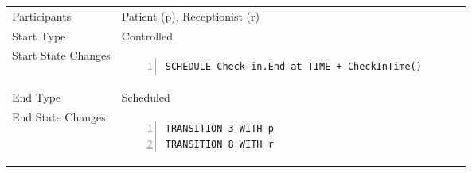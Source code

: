 \begin{tabular}{@{}>{\raggedright\arraybackslash}p{4.5cm}>{\raggedright\arraybackslash}p{12.5cm}@{}}
      \toprule
      Participants  & Patient (p), Receptionist (r) \\
      Start Type & Controlled \\
      Start State Changes &
\begin{Verbatim}[numbers=left]
SCHEDULE Check in.End at TIME + CheckInTime()
\end{Verbatim}
      \\
     End Type& Scheduled \\
     End State Changes &
\begin{Verbatim}[numbers=left]
TRANSITION 3 WITH p
TRANSITION 8 WITH r
\end{Verbatim}
      \\ \bottomrule
      \end{tabular}